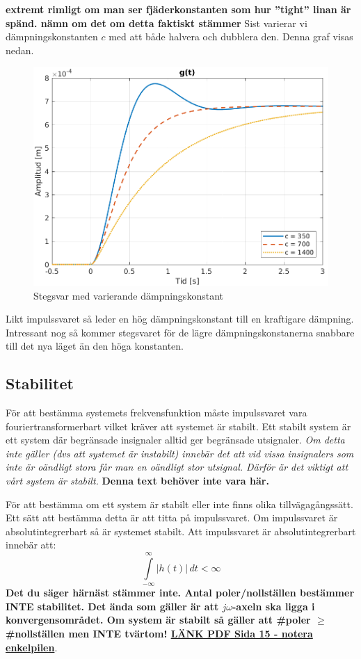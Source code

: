 \textbf{extremt rimligt om man ser fjäderkonstanten som hur ''tight'' linan är spänd. nämn om det om detta faktiskt stämmer}
\newpage
Sist varierar vi dämpningskonstanten $c$ med att både halvera och dubblera den. Denna graf visas nedan.
\begin{figure}[H]
    \centering
    \includegraphics[scale=0.9]{bilder/stegsvar_variation_c}
    \caption{Stegsvar med varierande dämpningskonstant}
    \label{fig:stegsvar_variation_c}
\end{figure}
Likt impulssvaret så leder en hög dämpningskonstant till en kraftigare dämpning. Intressant nog så kommer stegsvaret för de lägre dämpningskonstanerna snabbare till det nya läget än den höga konstanten. 

\newpage
\subsection{Stabilitet}
För att bestämma systemets frekvensfunktion måste impulssvaret vara fouriertransformerbart vilket kräver att systemet är stabilt. Ett stabilt system är ett system där begränsade insignaler alltid ger begränsade utsignaler. \textit{Om detta inte gäller (dvs att systemet är instabilt) innebär det att vid vissa insignalers som inte är oändligt stora får man en oändligt stor utsignal. Därför är det viktigt att vårt system är stabilt.} \textbf{Denna text behöver inte vara här.}

För att bestämma om ett system är stabilt eller inte finns olika tillvägagångssätt. Ett sätt att bestämma detta är att titta på impulssvaret. Om impulssvaret är absolutintegrerbart så är systemet stabilt. Att impulssvaret är absolutintegrerbart innebär att:
$$\int\limits_{-\infty}^{\infty}\big|h(t)\big|\,dt < \infty$$
\textbf{Det du säger härnäst stämmer inte. Antal poler/nollställen bestämmer INTE stabilitet. Det ända som gäller är att $j\omega$-axeln ska ligga i konvergensområdet. Om system är stabilt så gäller att \#poler $\ge$ \#nollställen men INTE tvärtom! \href{https://www.cvl.isy.liu.se/education/undergraduate/TSKS06/foerelaesningar/Fo9-11.AnteckningsSidor.TSKS06.2016.pdf}{LÄNK PDF Sida 15 - notera enkelpilen}}.


